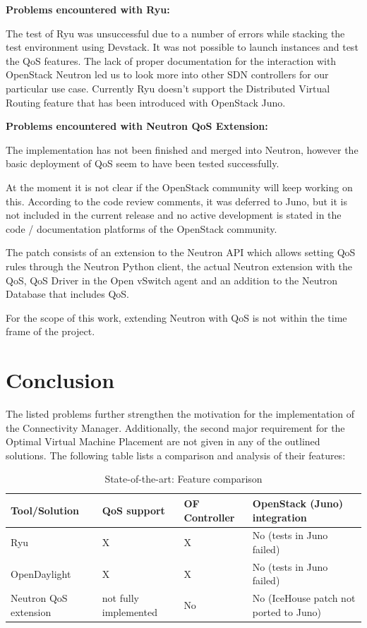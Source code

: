 \textbf{Problems encountered with Ryu:}

The test of Ryu was unsuccessful due to a number of errors while stacking the test environment using Devstack. It was not possible to launch instances and test the QoS features. The lack of proper documentation for the interaction with OpenStack Neutron led us to look more into other SDN controllers for our particular use case. Currently Ryu doesn't support the Distributed Virtual Routing feature that has been introduced with OpenStack Juno.


\textbf{Problems encountered with Neutron QoS Extension:}

The implementation has not been finished and merged into Neutron, however the basic deployment of QoS seem to have been tested successfully. 

At the moment it is not clear if the OpenStack community will keep working on this. According to the code review comments, it was deferred to Juno, but it is not included in the current release and no active development is stated in the code / documentation platforms of the OpenStack community.

The patch consists of an extension to the Neutron API which allows setting QoS rules through the Neutron Python client, the actual Neutron extension with the QoS, QoS Driver in the Open vSwitch agent and an addition to the Neutron Database that includes QoS.

For the scope of this work, extending Neutron with QoS is not within the time frame of the project.

\section{Conclusion}

The listed problems further strengthen the motivation for the implementation of the Connectivity Manager. Additionally, the second major requirement for the Optimal Virtual Machine Placement are not given in any of the outlined solutions. The following table lists a comparison and analysis of their features:




\begin{table}[H]
\centering

\begin{tabularx}{\textwidth}{ |X|X|X|X| }
\hline Tool/Solution & QoS support & OF Controller & OpenStack (Juno) integration \\ 
\hline Ryu & X & X & No (tests in Juno failed) \\ 
\hline OpenDaylight & X & X & No (tests in Juno failed) \\ 
\hline Neutron QoS extension & not fully implemented & No & No (IceHouse patch not ported to Juno) \\ 
\hline 
\end{tabularx}

\caption{State-of-the-art: Feature comparison}
\end{table}
